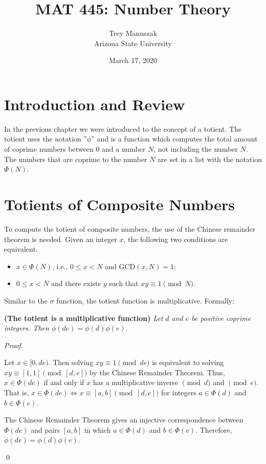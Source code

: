 \documentclass[12pt]{article}
\title{MAT 445: Number Theory}
\date{March 17, 2020}
\author{Trey Manuszak\\ Arizona State University}
\newenvironment{theorem}[2][Theorem]{\begin{trivlist}
\item[\hskip \labelsep {\bfseries #1}\hskip \labelsep {\bfseries #2}]}{\end{trivlist}}
\newenvironment{sol}
    {\emph{Proof.}
    }
    {
    \qed
    }
\begin{document}

\section{Introduction and Review}

\hspace{1em} In the previous chapter we were introduced to the concept of a totient. The totient uses the notation ”$\phi$” and is a function which computes the total amount of coprime numbers between $0$ and a number $N$, not including the number $N$. The numbers that are coprime to the number $N$ are set in a list with the notation $\Phi(N)$.

\section{Totients of Composite Numbers}

\hspace{1em} To compute the totient of composite numbers, the use of the Chinese remainder theorem is needed. Given an integer $x$, the following two conditions are equivalent.
\begin{itemize}
    \item $x \in \Phi(N)$, i.e., $0 \leq x < N$ and $\text{GCD}(x,N) = 1$;
    \item $0 \leq x < N$ and there exists $y$ such that $xy \equiv 1 \pmod{N}$. \cite[pg.178]{weissman_2017}
\end{itemize}

Similar to the $\sigma$ function, the totient function is multiplicative. Formally:

\begin{theorem}{7.9} \textbf{(The totient is a multiplicative function)} \textit{Let $d$ and $e$ be positive coprime integers. Then $\phi (de) = \phi (d) \phi (e)$}.
\end{theorem}

\begin{sol}
Let $x \in [0,de)$. Then solving $xy \equiv 1 \pmod{de}$ is equivalent to solving $xy \equiv [1,1] \pmod{[d,e]}$ by the Chinese Remainder Theorem. Thus, $x \in \Phi(de)$ if and only if $x$ has a multiplicative inverse $\pmod{d}$ and $\pmod{e}$. That is, $x \in \Phi(de) \Longleftrightarrow x \equiv [a,b] \pmod{[d,e]}$ for integers $a \in \Phi(d)$ and $b \in \Phi(e)$.

The Chinese Remainder Theorem gives an injective correspondence between $\Phi(de)$ and pairs $[a,b]$ in which $a \in \Phi(d)$ and $b \in \Phi(e)$. Therefore, $\phi(de) = \phi(d)\phi(e)$.
\end{sol}
\end{document}

